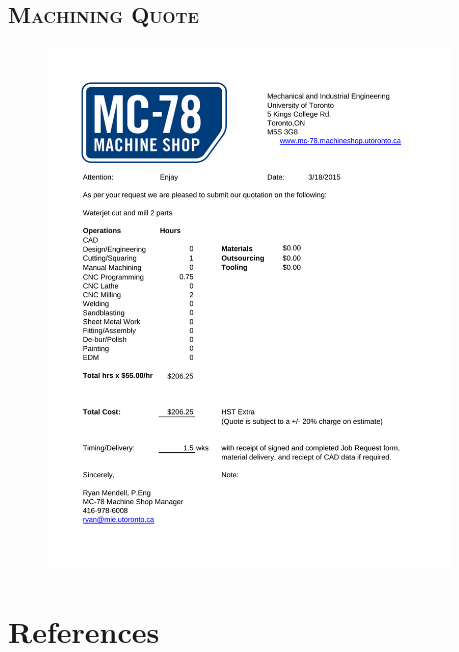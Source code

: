 \documentclass[12pt]{article}
\begin{document}
\subsection{\textsc{Machining Quote}}

\begin{figure}[h!]
  \centering
  	\includegraphics[width=0.95\textwidth]{MCQuote.pdf}
  \label{fig:mcquote}
\end{figure}

\newpage

\section*{References}
\end{document}
